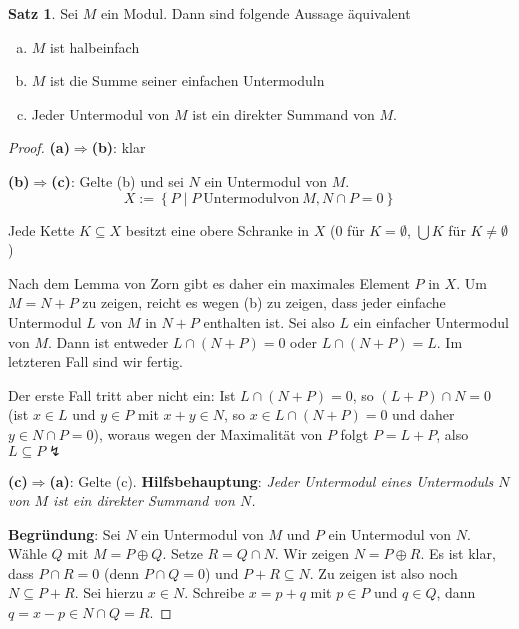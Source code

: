 \documentclass[
twoside=semi,
fontsize=12,
DIV=12, 
cleardoublepage=current,
leqno,
headings=optiontoheadandtoc, 
toc=idx
]{scrbook}
\newcommand{\set}[1]{\left\{ #1 \right\}}
\theoremstyle{definition}
\newtheorem{satz}[definition]{Satz}
\begin{document}
	\begin{satz}\label{1.3.10}\hfill\newline
		Sei $M$ ein Modul. Dann sind folgende Aussage \"aquivalent
		\begin{enumerate}[(a)]
			\item $M$ ist halbeinfach
			
			\item $M$ ist die Summe seiner einfachen Untermoduln
			
			\item Jeder Untermodul von $M$ ist ein direkter Summand von $M$.
		\end{enumerate}	
		
		\begin{proof}\hfill\newline
			\textbf{(a)$\Longrightarrow$(b)}: klar
			
			\medskip\noindent
			\textbf{(b)$\Longrightarrow$(c)}: Gelte (b) und sei $N$ ein Untermodul von $M$.
				\[X:= \set{P \mid P \ \mathrm{Untermodul von }\ M, N \cap P = 0}\]
			
			\noindent Jede Kette $K \subseteq X$ besitzt eine obere Schranke in $X$ ($0$ f\"ur $K = \emptyset$, $\bigcup K$ f\"ur $K \neq \emptyset$)
			
			\noindent Nach dem Lemma von Zorn gibt es daher ein maximales Element $P$ in $X$. Um $M = N + P$ zu zeigen, reicht es wegen (b) zu zeigen, dass jeder einfache Untermodul $L$ von $M$ in $N + P$ enthalten ist. Sei also $L$ ein einfacher Untermodul von $M$. Dann ist entweder $L \cap (N + P) = 0$ oder $L \cap (N + P) = L$. Im letzteren Fall sind wir fertig.
			
			\noindent Der erste Fall tritt aber nicht ein:\newline
			Ist $L \cap (N+P) = 0$, so $(L+P)\cap N = 0$ (ist $x \in L$ und $y \in P$ mit $x+y \in N$, so $x \in L\cap (N+P) = 0$ und daher $y \in N\cap P = 0$), woraus wegen der Maximalit\"at von $P$ folgt $P = L + P$, also $L \subseteq P \lightning$
			
			\medskip\noindent 
			\textbf{(c)$\Longrightarrow$(a)}: Gelte (c).\newline
			\textbf{Hilfsbehauptung}: \emph{Jeder Untermodul eines Untermoduls $N$ von $M$ ist ein direkter Summand von $N$.}
			
			\noindent \textbf{Begr\"undung}: Sei $N$ ein Untermodul von $M$ und $P$ ein Untermodul von $N$.
			W\"ahle $Q$ mit $M = P \oplus Q$. Setze $R = Q \cap N$. Wir zeigen $N = P \oplus R$. Es ist klar, dass $P \cap R = 0$ (denn $P \cap Q = 0$) und $P + R \subseteq N$. Zu zeigen ist also noch $N \subseteq P + R$. \newline
			Sei hierzu $x \in N$. Schreibe $x = p + q$ mit $p \in P$ und $q \in Q$, dann $q = x - p \in N \cap Q = R$.  
			

\end{proof}
\end{satz}
\end{document}
